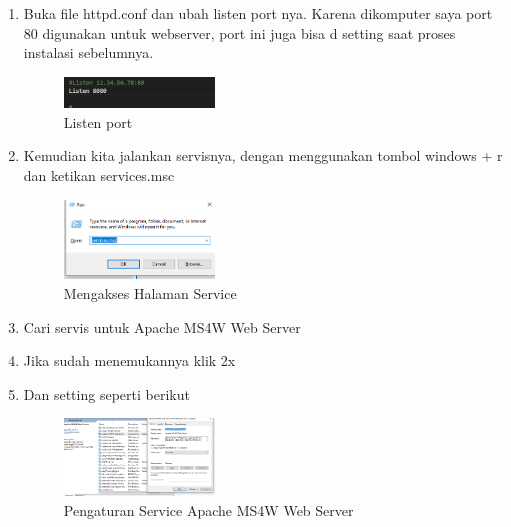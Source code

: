 \begin{enumerate}
  \item Buka file httpd.conf dan ubah listen port nya. Karena dikomputer saya port 80 digunakan untuk webserver, port ini juga bisa d setting saat proses instalasi sebelumnya.
  \hfill\break
    \begin{figure}[H]
		\includegraphics[width=4cm]{figures/1174039/tugas4/7.png}
		\centering
		\caption{Listen port}
    \end{figure}
  \item Kemudian kita jalankan servisnya, dengan menggunakan tombol windows + r dan ketikan services.msc
  \hfill\break
    \begin{figure}[H]
		\includegraphics[width=4cm]{figures/1174039/tugas4/8.png}
		\centering
		\caption{Mengakses Halaman Service}
    \end{figure}
  \item Cari servis untuk Apache MS4W Web Server
  \item Jika sudah menemukannya klik 2x
  \item Dan setting seperti berikut
  \hfill\break
    \begin{figure}[H]
		\includegraphics[width=4cm]{figures/1174039/tugas4/9.png}
		\centering
		\caption{Pengaturan Service Apache MS4W Web Server}
    \end{figure}
\end{enumerate}
